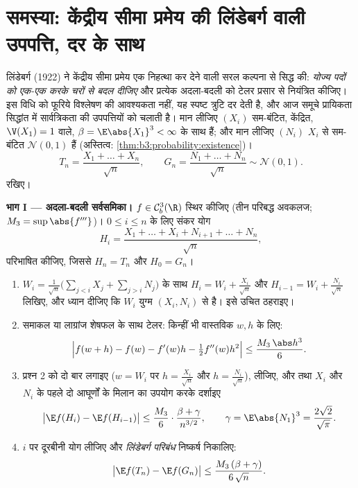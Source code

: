 \section{समस्या: केंद्रीय सीमा प्रमेय की लिंडेबर्ग वाली उपपत्ति,
दर के साथ}

\begin{problem}[{सप्ताहांत समस्या --- प्रतिस्थापन विधि}]
\label{pb:b3:clt:1}
लिंडेबर्ग (1922) ने केंद्रीय सीमा प्रमेय एक निहत्था कर देने वाली
सरल कल्पना से सिद्ध की: \emph{योज्य पदों को एक-एक करके  चरों
से बदल दीजिए} और प्रत्येक अदला-बदली को टेलर प्रसार से नियंत्रित
कीजिए। इस विधि को फूरिये विश्लेषण की आवश्यकता नहीं, यह स्पष्ट त्रुटि
दर देती है, और आज समूचे प्रायिकता सिद्धांत में सार्वत्रिकता की
उपपत्तियों को चलाती है। मान लीजिए $(X_i)$  सम-बंटित, केंद्रित,
$\V(X_1) = 1$ वाले, $\beta = \E\abs{X_1}^3 < \infty$ के साथ हैं; और मान लीजिए $(N_i)$ $X_i$ से 
 सम-बंटित $\mathcal N(0,1)$ हैं (अस्तित्व: \cref{thm:b3:probability:existence})।
\[
T_n = \frac{X_1 + \dots + X_n}{\sqrt n},
\qquad
G_n = \frac{N_1 + \dots + N_n}{\sqrt n} \sim \mathcal N(0,1).
\] रखिए।

\medskip
\noindent\textbf{भाग I --- अदला-बदली सर्वसमिका।} $f
\in \mathcal C^3_b(\R)$ स्थिर कीजिए
(तीन परिबद्ध  अवकलज; $M_3 = \sup\abs{f'''}$)। $0 \leq i \leq n$ के लिए संकर योग
\[
H_i = \frac{X_1 + \dots + X_i + N_{i+1} + \dots +
N_n}{\sqrt n},
\]
परिभाषित कीजिए, जिससे $H_n = T_n$ और $H_0 = G_n$।
\begin{enumerate}
  \item $W_i =
        \frac{1}{\sqrt n}\bigl(\sum_{j<i}X_j +
        \sum_{j>i}N_j\bigr)$ के साथ $H_i = W_i + \frac{X_i}{\sqrt n}$ और $H_{i-1}
        = W_i + \frac{N_i}{\sqrt n}$ लिखिए, और ध्यान दीजिए कि $W_i$
        युग्म $(X_i, N_i)$ से  है। इसे उचित ठहराइए।
  \item समाकल या लाग्रांज शेषफल के साथ टेलर: किन्हीं भी वास्तविक
        $w, h$ के लिए:
        \[
        \Bigl|f(w + h) - f(w) - f'(w)h -
        \tfrac12f''(w)h^2\Bigr| \leq
        \frac{M_3\,\abs h^3}{6} .
        \]
  \item प्रश्न 2 को दो बार लगाइए ($w = W_i$ पर $h = \frac{X_i}{\sqrt n}$ और $h = \frac{N_i}{\sqrt n}$),
         लीजिए, और  तथा $X_i$ और $N_i$ के पहले
        दो आघूर्णों के मिलान का उपयोग करके दर्शाइए
        \[
        \bigl|\E f(H_i) - \E f(H_{i-1})\bigr|
        \leq \frac{M_3}{6}\cdot
        \frac{\beta + \gamma}{n^{3/2}},
        \qquad \gamma = \E\abs{N_1}^3 =
        \frac{2\sqrt2}{\sqrt\pi} .
        \]
  \item $i$ पर दूरबीनी योग लीजिए और \emph{लिंडेबर्ग परिबंध}
        निष्कर्ष निकालिए:
        \[
        \bigl|\E f(T_n) - \E f(G_n)\bigr| \leq
        \frac{M_3\,(\beta + \gamma)}{6\,\sqrt n} .
        \]
\end{enumerate}


\end{problem}
